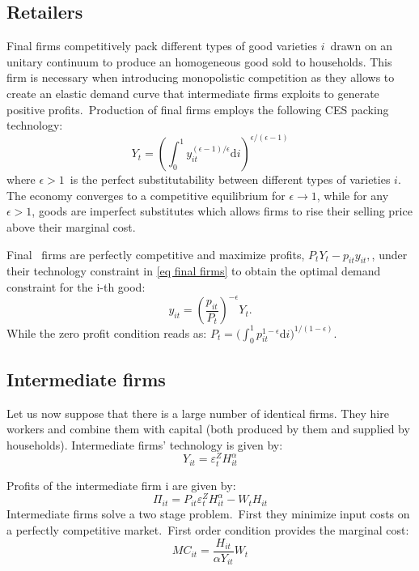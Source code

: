 \documentclass[a4paper,12pt]{article}%
\begin{document}
\subsection{Retailers}

Final firms competitively pack different types of good varieties $i$\ drawn on
an unitary continuum to produce an homogeneous good sold to households. This
firm is necessary when introducing monopolistic competition as they allows to
create an elastic demand curve that intermediate firms exploits to generate
positive profits.\ Production of final firms employs the following CES packing
technology:%
\begin{equation}
Y_{t}=\left(
{\displaystyle\int\nolimits_{0}^{1}}
y_{it}^{\left(  \epsilon-1\right)  /\epsilon}\text{d}i\right)  ^{\epsilon
/\left(  \epsilon-1\right)  } \label{eq final firms}%
\end{equation}
where $\epsilon>1$\ is the perfect substitutability between different types of
varieties $i$. The economy converges to a competitive equilibrium for
$\epsilon\rightarrow1$, while for any $\epsilon>1$, goods are imperfect
substitutes which allows firms to rise their selling price above their
marginal cost.

Final \ firms are perfectly competitive and maximize profits, $P_{t}%
Y_{t}-p_{it}y_{it},$, under their technology constraint in
\autoref{eq final firms} to obtain the optimal demand constraint for the i-th
good:%
\begin{equation}
y_{it}=\left(  \frac{p_{it}}{P_{t}}\right)  ^{-\epsilon}Y_{t}.
\end{equation}
While the zero profit condition reads as: $P_{t}=(%
{\textstyle\int\nolimits_{0}^{1}}
p_{it}^{1-\epsilon}$d$i)^{1/(1-\epsilon)}.$

\subsection{Intermediate firms}

Let us now suppose that there is a large number of identical firms. They hire
workers and combine them with capital (both produced by them and supplied by
households). Intermediate firms' technology is given by:%
\begin{equation}
Y_{it}=\varepsilon_{t}^{Z}H_{it}^{\alpha}%
\end{equation}


Profits of the intermediate firm i are given by:%
\begin{equation}
\Pi_{it}=P_{it}\varepsilon_{t}^{Z}H_{it}^{\alpha}-W_{t}H_{it}%
\end{equation}
Intermediate firms solve a two stage problem.\ First they minimize input costs
on a perfectly competitive market.\ First order condition provides the
marginal cost:%
\begin{equation}
MC_{it}=\frac{H_{it}}{\alpha Y_{it}}W_{t}%
\end{equation}
\end{document}
